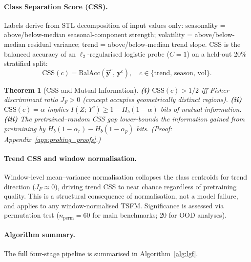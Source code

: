 \documentclass[10pt]{article}
\newtheorem{theorem}{Theorem}[section]
\theoremstyle{definition}
\theoremstyle{remark}
\newcommand{\css}{\ensuremath{\mathrm{CSS}}}
\newcommand{\Hb}{\ensuremath{H_b}}
\newcommand{\BalAcc}{\ensuremath{\mathrm{BalAcc}}}
\begin{document}
\paragraph{Class Separation Score (CSS).}
Labels derive from STL decomposition of input values only:
seasonality = above/below-median seasonal-component strength;
volatility = above/below-median residual variance;
trend = above/below-median trend slope.
CSS is the balanced accuracy of an $\ell_2$-regularised logistic probe
($C{=}1$) on a held-out 20\% stratified split:
\begin{equation}
  \css(c) = \BalAcc\!\left(\hat{\mathbf{y}}^c,\, \mathbf{y}^c\right),
  \quad c \in \{\mathrm{trend},\,\mathrm{season},\,\mathrm{vol}\}.
  \label{eq:css}
\end{equation}

\begin{theorem}[CSS and Mutual Information]
\label{thm:css_main}
\textbf{(i)} $\css(c) > 1/2$ iff Fisher discriminant ratio $J_F > 0$
(concept occupies geometrically distinct regions).
\textbf{(ii)} $\css(c) = \alpha$ implies $I(Z;\,Y^c) \geq 1 - \Hb(1{-}\alpha)$
bits of mutual information.
\textbf{(iii)} The pretrained--random CSS gap lower-bounds the information
gained from pretraining by $\Hb(1{-}\alpha_r) - \Hb(1{-}\alpha_p)$ bits.
\emph{(Proof: Appendix~\ref{app:probing_proofs}.)}
\end{theorem}

\paragraph{Trend CSS and window normalisation.}
Window-level mean--variance normalisation collapses the class centroids for
trend direction ($J_F \approx 0$), driving trend CSS to near chance regardless
of pretraining quality.
This is a structural consequence of normalisation, not a model failure, and
applies to any window-normalised TSFM.
Significance is assessed via permutation test
($n_{\mathrm{perm}}{=}60$ for main benchmarks; $20$ for OOD analyses).

\paragraph{Algorithm summary.}
The full four-stage pipeline is summarised in Algorithm~\ref{alg:lgf}.
\end{document}

